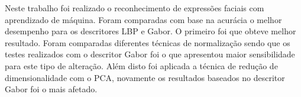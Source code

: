 Neste trabalho foi realizado o reconhecimento de expressões faciais com aprendizado de máquina. Foram comparadas com base na acurácia o melhor desempenho para os descritores LBP e Gabor. O primeiro foi que obteve melhor resultado. Foram comparadas diferentes técnicas de normalização sendo que os testes realizados com o descritor Gabor foi o que apresentou maior sensibilidade para este tipo de alteração. Além disto foi aplicada a técnica de redução de dimensionalidade com o PCA, novamente os resultados baseados no descritor Gabor foi o mais afetado.
